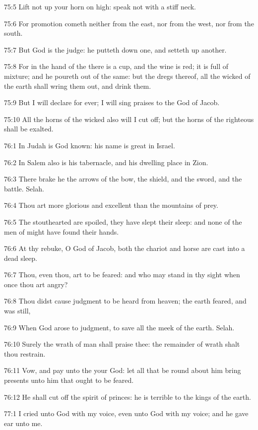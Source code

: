 75:5 Lift not up your horn on high: speak not with a stiff neck.

75:6 For promotion cometh neither from the east, nor from the west, nor from the south.

75:7 But God is the judge: he putteth down one, and setteth up another.

75:8 For in the hand of the \LORD there is a cup, and the wine is red; it is full of mixture; and he poureth out of the same: but the dregs thereof, all the wicked of the earth shall wring them out, and drink them.

75:9 But I will declare for ever; I will sing praises to the God of Jacob.

75:10 All the horns of the wicked also will I cut off; but the horns of the righteous shall be exalted.



76:1 In Judah is God known: his name is great in Israel.

76:2 In Salem also is his tabernacle, and his dwelling place in Zion.

76:3 There brake he the arrows of the bow, the shield, and the sword, and the battle. Selah.

76:4 Thou art more glorious and excellent than the mountains of prey.

76:5 The stouthearted are spoiled, they have slept their sleep: and none of the men of might have found their hands.

76:6 At thy rebuke, O God of Jacob, both the chariot and horse are cast into a dead sleep.

76:7 Thou, even thou, art to be feared: and who may stand in thy sight when once thou art angry?

76:8 Thou didst cause judgment to be heard from heaven; the earth feared, and was still,

76:9 When God arose to judgment, to save all the meek of the earth.  Selah.

76:10 Surely the wrath of man shall praise thee: the remainder of wrath shalt thou restrain.

76:11 Vow, and pay unto the \LORD your God: let all that be round about him bring presents unto him that ought to be feared.

76:12 He shall cut off the spirit of princes: he is terrible to the kings of the earth.



77:1 I cried unto God with my voice, even unto God with my voice; and he gave ear unto me.

